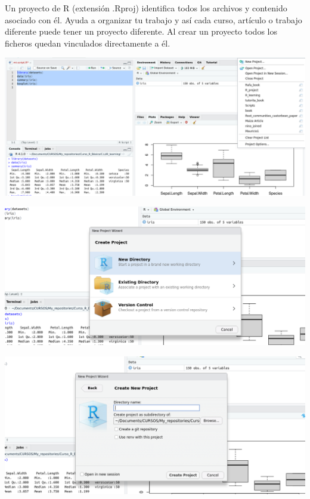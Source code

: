 \documentclass[
]{book}
\begin{document}
Un proyecto de R (extensión .Rproj) identifica todos los archivos y contenido asociado con él.
Ayuda a organizar tu trabajo y así cada curso, artículo o trabajo diferente puede tener un proyecto diferente.
Al crear un proyecto todos los ficheros quedan vinculados directamente a él.\\

\begin{center}\includegraphics[width=400pt]{images/new_directory} \end{center}

\hfill\break

\begin{center}\includegraphics[width=400pt]{images/new_directory2} \end{center}

\hfill\break

\begin{center}\includegraphics[width=400pt]{images/new_directory3} \end{center}
\end{document}

